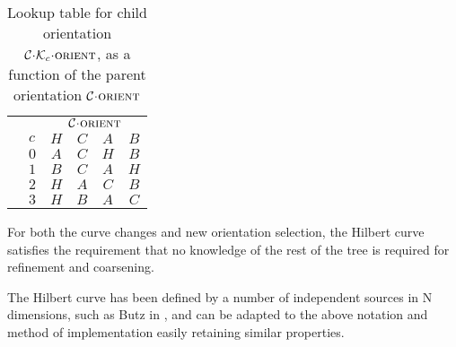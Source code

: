 \documentclass[twoside]{IIBproject}
\newcommand{\acc}{{\mkern 0.5mu\cdot\mkern 0.5mu}}
\numberwithin{figure}{section}
\begin{document}
            \begin{table}[!htbp]
                \centering
                \captionsetup{width=0.8\textwidth}
                \caption{Lookup table for child orientation $\mathcal{C}\acc\mathcal{K}_c\acc\textproc{orient}$, as a function of the parent orientation $\mathcal{C}\acc\textproc{orient}$}
                \label{tab:hilb-Dc}
                \begin{tabularx}{5cm}{l>{\raggedright}X*{4}{c}}
                    \toprule
                    &   & \multicolumn{4}{c}{$\mathcal{C}\acc\textproc{orient}$} \\ \cmidrule{3-6}
                    & $c$   & $H$    & $C$    & $A$    & $B$    \\ \midrule
                    & $0$   & $A$    & $C$    & $H$    & $B$    \\
                    & $1$   & $B$    & $C$    & $A$    & $H$    \\
                    & $2$   & $H$    & $A$    & $C$    & $B$    \\
                    & $3$   & $H$    & $B$    & $A$    & $C$    \\ \bottomrule
                \end{tabularx}
            \end{table}

            For both the curve changes and new orientation selection, the Hilbert curve satisfies the requirement that no knowledge of the rest of the tree is required for refinement and coarsening.

            The Hilbert curve has been defined by a number of independent sources in N dimensions, such as Butz in \cite{butz71}, and can be adapted to the above notation and method of implementation easily retaining similar properties. 
\end{document}
